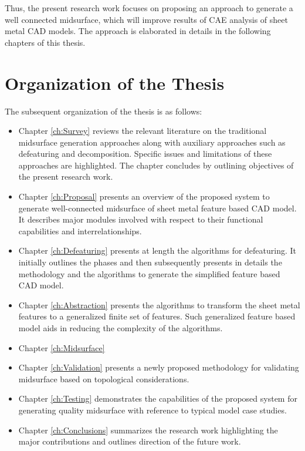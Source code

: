 Thus, the present research work focuses on proposing an approach to generate a well connected midsurface, which will improve results of CAE analysis of sheet metal CAD models. The approach is elaborated in details in the following chapters of this thesis.

\section{Organization of the Thesis}

The subsequent organization of the thesis is as follows:

\begin{itemize}[label={},leftmargin=*]

\item Chapter  \ref{ch:Survey} reviews the relevant literature on the traditional midsurface generation approaches along with auxiliary approaches such as defeaturing and decomposition. Specific issues and limitations of these approaches are highlighted. The chapter concludes by outlining objectives of the present research work.

\item Chapter \ref{ch:Proposal} presents an overview of the proposed system to generate well-connected midsurface of sheet metal feature based CAD model. It describes major modules involved with respect to their functional capabilities and interrelationships.

\item Chapter \ref{ch:Defeaturing} presents at length the algorithms for defeaturing.  It initially outlines the phases and then subsequently presents in details the methodology and the algorithms to generate the simplified feature based CAD model.

\item Chapter \ref{ch:Abstraction} presents the algorithms to transform the sheet metal features to a generalized finite set of features. Such generalized feature based model aids in reducing the complexity of the algorithms.

\item Chapter \ref{ch:Midsurface} 

\item Chapter \ref{ch:Validation} presents a newly proposed methodology for validating midsurface based on topological considerations.

\item Chapter \ref{ch:Testing} demonstrates the capabilities of the proposed system for generating quality midsurface with reference to typical model case studies.

\item Chapter \ref{ch:Conclusions} summarizes the research work highlighting the major contributions and outlines direction of the future work.
\end{itemize}



